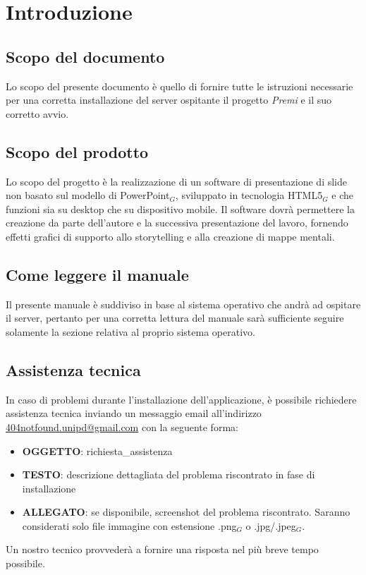 \section{Introduzione}
\subsection{Scopo del documento}
Lo scopo del presente documento è quello di fornire tutte le istruzioni necessarie per una corretta installazione del server ospitante il progetto \emph{Premi} e il suo corretto avvio.

\subsection{Scopo del prodotto}
Lo scopo del progetto è la realizzazione di un software di presentazione di slide non basato sul modello di PowerPoint$_{G}$, sviluppato in tecnologia HTML5$_{G}$ e che funzioni sia su desktop che su dispositivo mobile. Il software dovrà permettere la creazione da parte dell'autore e la successiva presentazione del lavoro, fornendo effetti grafici di supporto allo storytelling e alla creazione di mappe mentali.

\subsection{Come leggere il manuale}
Il presente manuale è suddiviso in base al sistema operativo che andrà ad ospitare il server, pertanto per una corretta lettura del manuale sarà sufficiente seguire solamente la sezione relativa al proprio sistema operativo.

\subsection{Assistenza tecnica}
In caso di problemi durante l'installazione dell'applicazione, è possibile richiedere assistenza tecnica inviando un messaggio email all'indirizzo \href{mailto:404notfound.unipd@gmail.com}{404notfound.unipd@gmail.com} con la seguente forma:
\begin{itemize}
\item \textbf{OGGETTO}: richiesta\_assistenza
\item \textbf{TESTO}: descrizione dettagliata del problema riscontrato in fase di installazione
\item \textbf{ALLEGATO}: se disponibile, screenshot del problema riscontrato. Saranno considerati solo file immagine con estensione .png$_G$ o .jpg/.jpeg$_G$.
\end{itemize}
Un nostro tecnico provvederà a fornire una risposta nel più breve tempo possibile.

